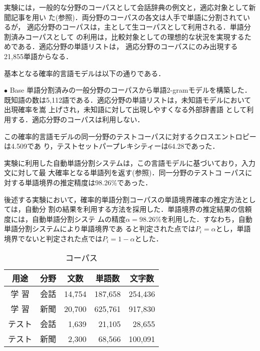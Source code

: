 実験には，一般的な分野のコーパスとして会話辞典の例文と，適応対象として新聞記事を用い
た(参照)．両分野のコーパスの各文は人手で単語に分割されているが，
適応分野のコーパスは，主として生コーパスとして利用される．単語分割済みコーパスとして
の利用は，比較対象としての理想的な状況を実現するためである．適応分野の単語リストは，
適応分野のコーパスにのみ出現する21,855単語からなる．

基本となる確率的言語モデルは以下の通りである．
\begin{list}{}{}
\item[$\bullet$ Base] 単語分割済みの一般分野のコーパスから単語2-gramモデルを構築した．
  既知語の数は5,112語である．適応分野の単語リストは，未知語モデルにおいて出現確率を嵩
  上げされ，未知語に対して出現しやすくなる外部辞書語\cite{日本語の情報量の上限の推定} 
  として利用する．適応分野のコーパスは利用しない．
\end{list}
この確率的言語モデルの同一分野のテストコーパスに対するクロスエントロピーは4.509であ
り，テストセットパープレキシティーは64.28であった\footnotemark．

実験に利用した自動単語分割システムは，この言語モデルに基づいており，入力文に対して最
大確率となる単語列を返す(参照)．同一分野のテストコ
ーパスに対する単語境界の推定精度は98.26\%であった\footnotemark．

後述する実験において，確率的単語分割コーパスの単語境界確率の推定方法としては，自動分
割の結果を利用する方法を採用した．単語境界の推定結果の信頼度には，自動単語分割システ
ムの精度$\alpha=98.26\%$を利用した．すなわち，自動単語分割システムにより単語境界であ
ると判定された点では$P_{i} = \alpha$とし，単語境界でないと判定された点では$P_{i} =
1-\alpha$とした．

\begin{table}[t]
  \caption{コーパス}
  \begin{center}
    \begin{tabular}{c|c|r|r|r}
      \hline
      \hline
      用途   & 分野 & \multicolumn{1}{c|}{文数} & \multicolumn{1}{c|}{単語数} &
        \multicolumn{1}{c}{文字数} \\
      \hline
      学  習 & 会話 & 14,754 & 187,658 & 254,436 \\
      学  習 & 新聞 & 20,700 & 625,761 & 917,830 \\
      テスト & 会話 &  1,639 &  21,105 &  28,655 \\
      テスト & 新聞 &  2,300 &  68,566 & 100,091 \\
      \hline
    \end{tabular}
  \end{center}
  \label{table:corpus}
\end{table}



